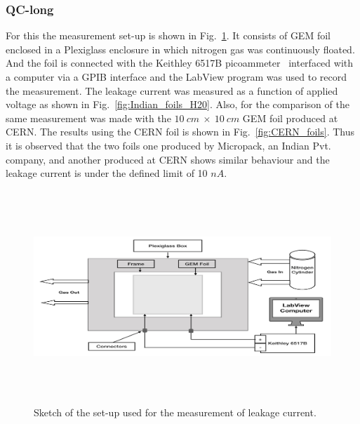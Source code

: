 \subsubsection{QC-long} %
\label{ssub:qc_long}
For this the measurement set-up is shown in Fig.~\ref{fig:Cleaning_Measurement}. It consists of GEM foil enclosed in a Plexiglass enclosure in which nitrogen gas was continuously floated. And the foil is connected with the Keithley 6517B picoammeter~\cite{Keithley-6517B-picoammeter} interfaced with a computer via a GPIB interface and the LabView program was used to record the measurement. The leakage current was measured as a function of applied voltage as shown in Fig.~\ref{fig:Indian_foils_H20}. Also, for the comparison of the same measurement was made with the $10~cm~\times~10~cm$ GEM foil produced at CERN. The results using the CERN foil is shown in Fig.~\ref{fig:CERN_foils}. Thus it is observed that the two foils one produced by Micropack, an Indian Pvt. company, and another produced at CERN shows similar behaviour and the leakage current is under the defined limit of 10 $nA$.
\begin{figure}[!htbp]
    \centering
        \includegraphics[width=12cm,height=8cm]{figures/GEM/figures/10.jpeg}
   \caption{Sketch of the set-up used for the measurement of leakage current.} \label{fig:Cleaning_Measurement}
\end{figure}
